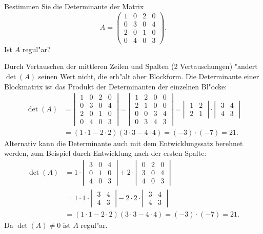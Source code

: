 Bestimmen Sie die Determinante der Matrix
\[
A=\begin{pmatrix}
1&0&2&0\\
0&3&0&4\\
2&0&1&0\\
0&4&0&3
\end{pmatrix}.
\]
Ist $A$ regul"ar?

\begin{loesung}
Durch Vertauschen der mittleren Zeilen und Spalten (2 Vertauschungen) "andert $\det(A)$
seinen Wert nicht, die erh"alt aber Blockform. Die Determinante einer Blockmatrix ist
das Produkt der Determinanten der einzelnen Bl"ocke:
\begin{align*}
\det(A)&=
\left|\;\begin{matrix}
1&0&2&0\\
0&3&0&4\\
2&0&1&0\\
0&4&0&3
\end{matrix}\;\right|
=
\left|\;\begin{matrix}
1&2&0&0\\
2&1&0&0\\
0&0&3&4\\
0&3&4&3
\end{matrix}\;\right|
=
\left|\;\begin{matrix}
1&2\\2&1
\end{matrix}\;\right|
\cdot
\left|\;\begin{matrix}
3&4\\4&3
\end{matrix}\;\right|
\\
&=
(1\cdot 1-2\cdot 2)(3\cdot 3-4\cdot 4)=(-3)\cdot(-7)=21.
\end{align*}
Alternativ kann die Determinante auch mit dem Entwicklungssatz
berehnet werden, zum Beispiel durch Entwicklung nach der ersten
Spalte:
\begin{align*}
\det(A)
&=
1\cdot\left|\;\begin{matrix}
3&0&4\\
0&1&0\\
4&0&3
\end{matrix}\;\right|
+
2\cdot\left|\;\begin{matrix}
0&2&0\\
3&0&4\\
4&0&3
\end{matrix}\;\right|
\\
&=
1\cdot 1\cdot\left|\;\begin{matrix}3&4\\4&3\end{matrix}\;\right|
-2\cdot 2\cdot\left|\;\begin{matrix}3&4\\4&3\end{matrix}\;\right|
\\
&=
(1\cdot 1-2\cdot 2)(3\cdot 3-4\cdot 4)=(-3)\cdot(-7)=21.
\end{align*}
Da $\det(A)\ne 0$ ist $A$ regul"ar.
\end{loesung}

